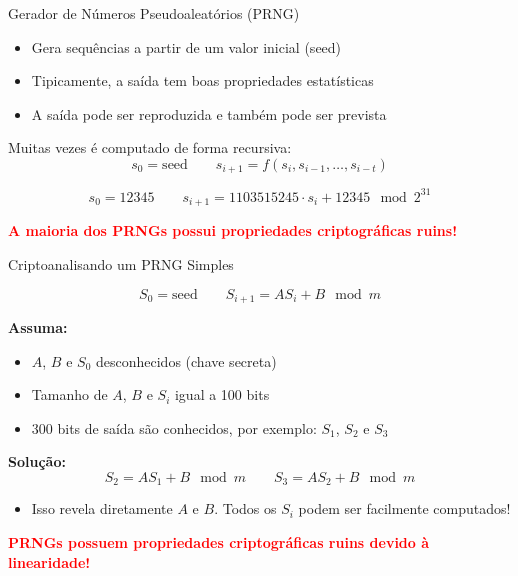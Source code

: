\documentclass{beamer}
\begin{document}
\begin{frame}{Gerador de Números Pseudoaleatórios (PRNG)}
\begin{itemize}
    \item Gera sequências a partir de um valor inicial (seed)
    \item Tipicamente, a saída tem boas propriedades estatísticas
    \item A saída pode ser reproduzida e também pode ser prevista
\end{itemize}

Muitas vezes é computado de forma recursiva:
\[
s_0 = \text{seed}
\quad\quad
s_{i+1} = f(s_i, s_{i-1}, \ldots, s_{i-t})
\]

\begin{tcolorbox}[colback=white, colframe=red!50!black, title=Exemplo: função \texttt{rand()} em ANSI C]
\[
s_0 = 12345
\quad\quad
s_{i+1} = 1103515245 \cdot s_i + 12345 \mod 2^{31}
\]
\end{tcolorbox}

\vspace{0.5em}
\textbf{\textcolor{red}{A maioria dos PRNGs possui propriedades criptográficas ruins!}}

\end{frame}


\begin{frame}{Criptoanalisando um PRNG Simples}

\begin{tcolorbox}[colback=white, colframe=red!50!black, title=PRNG Simples: \textbf{Gerador Congruente Linear}]
\[
S_0 = \text{seed}
\quad\quad
S_{i+1} = A S_i + B \mod m
\]
\end{tcolorbox}

\textbf{Assuma:}
\begin{itemize}
    \item $A$, $B$ e $S_0$ desconhecidos (chave secreta)
    \item Tamanho de $A$, $B$ e $S_i$ igual a 100 bits
    \item 300 bits de saída são conhecidos, por exemplo: $S_1$, $S_2$ e $S_3$
\end{itemize}

\textbf{Solução:}
\[
S_2 = A S_1 + B \mod m
\quad\quad
S_3 = A S_2 + B \mod m
\]

\begin{itemize}
    \item Isso revela diretamente $A$ e $B$. Todos os $S_i$ podem ser facilmente computados!
\end{itemize}

\small{\textbf{\textcolor{red}{PRNGs possuem propriedades criptográficas ruins devido à linearidade!}}}

\end{frame}
\end{document}
